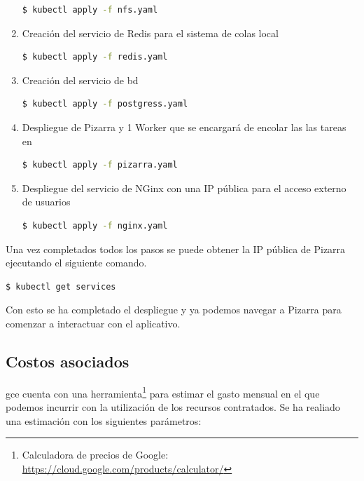 \documentclass[11pt,spanish,listoffigures,listoftables]{tfgetsinf}
\begin{document}
\begin{enumerate}
	\begin{lstlisting}[language=bash]	
	$ kubectl apply -f nfs.yaml
	\end{lstlisting}
	
	\item Creación del servicio de Redis para el sistema de colas local
	
	\begin{lstlisting}[language=bash]	
	$ kubectl apply -f redis.yaml
	\end{lstlisting}
	
	\item Creación del servicio de \acrlong{bd}
	
	\begin{lstlisting}[language=bash]	
	$ kubectl apply -f postgress.yaml
	\end{lstlisting}
	
	\item Despliegue de Pizarra y 1 Worker que se encargará de encolar las las \Gls{tarea}s en \kahan
	
	\begin{lstlisting}[language=bash]	
	$ kubectl apply -f pizarra.yaml
	\end{lstlisting}
	
	\item Despliegue del servicio de NGinx con una IP pública para el acceso externo de usuarios
	
	\begin{lstlisting}[language=bash]	
	$ kubectl apply -f nginx.yaml
	\end{lstlisting}
	
\end{enumerate}

Una vez completados todos los pasos se puede obtener la IP pública de Pizarra ejecutando el siguiente comando.

\begin{lstlisting}[language=bash]	
$ kubectl get services
\end{lstlisting}

Con esto se ha completado el despliegue y ya podemos navegar a Pizarra para comenzar a interactuar con el aplicativo.

\subsection{Costos asociados}

\acrshort{gce} cuenta con una herramienta\footnote{Calculadora de precios de Google: \url{https://cloud.google.com/products/calculator/}} para estimar el gasto mensual en el que podemos incurrir con la utilización de los recursos contratados. Se ha realiado una estimación con los siguientes parámetros:
\end{document}

